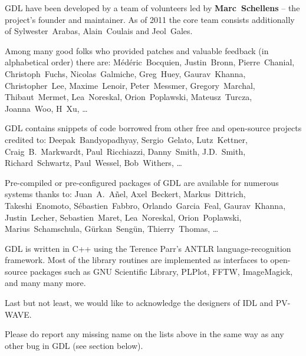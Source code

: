 
GDL have been developed by a team of volunteers led by {\bf Marc~Schellens} --
  the project's founder and maintainer.
As of 2011 the core team consists additionally of 
  Sylwester~Arabas, Alain~Coulais and Jeol~Gales.

Among many good folks who provided patches and valuable feedback (in alphabetical order) there are:
M\'ed\'eric~Bocquien, %
Justin~Bronn, %
Pierre~Chanial, %
Christoph~Fuchs, %
Nicolas~Galmiche, %
Greg~Huey, %
Gaurav~Khanna, %
Christopher~Lee, %
Maxime~Lenoir, %
Peter~Messmer, %
Gregory~Marchal, %
Thibaut~Mermet, %
Lea~Noreskal, %
Orion~Poplawski, %
Mateusz~Turcza, %
Joanna~Woo, %
H~Xu, %
\ldots

GDL contains snippets of code borrowed from other free and open-source projects credited to:
Deepak~Bandyopadhyay, %
Sergio~Gelato, %
Lutz~Kettner, %
Craig~B.~Markwardt, %
Paul~Ricchiazzi, %
Danny~Smith, %
J.D.~Smith, %
Richard~Schwartz, %
Paul~Wessel, %
Bob~Withers, %
\ldots

Pre-compiled or pre-configured packages of GDL are available for numerous systems thanks to:
Juan~A.~A\~nel, %
Axel~Beckert, %
Markus~Dittrich, %
Takeshi~Enomoto, %
S\'ebastien~Fabbro, %
Orlando~Garcia~Feal, %
Gaurav~Khanna, %
Justin~Lecher, %
Sebastien~Maret, %
Lea~Noreskal, %
Orion~Poplawski, %
Marius~Schamschula, %
G\"urkan~Seng\"un, %
Thierry~Thomas, %
\ldots

GDL is written in C++ using the Terence Parr's ANTLR language-recognition framework. 
Most of the library routines are implemented as interfaces to open-source packages 
  such as GNU Scientific Library, PLPlot, FFTW, ImageMagick, and many many more. 

Last but not least, we would like to acknowledge the designers of IDL and PV-WAVE.

Please do report any missing name on the lists above in the same way
  as any other bug in GDL (see section below).
